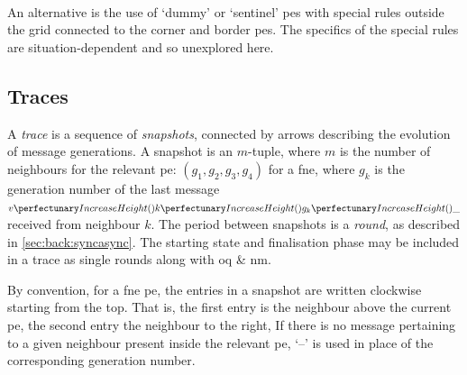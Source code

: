 \begin{cprulesetfloat}
    \begin{cpruleset}
        
        \\
        
        
    \end{cpruleset}
    \caption[Alternative forms of \cref{ruleset:nmp:proxspec}'s Rule 1]{\label{ruleset:nmp:3alts}Alternative forms of \cref{ruleset:nmp:proxspec}'s  for \glspl{pe} on the border of a grid or in the corner of a grid, respectively}
\end{cprulesetfloat}

An alternative is the use of `dummy' or `sentinel' \glspl{pe} with special rules outside the grid connected to the corner and border \glspl{pe}.  The specifics of the special rules are situation-dependent and so unexplored here.

\subsection{Traces}

A \emph{trace} is a sequence of \emph{snapshots}, connected by arrows \tarr{} describing the evolution of message generations. A snapshot is an \(m\)-tuple, where \(m\) is the number of neighbours for the relevant \gls{pe}:  \((g_1, g_2, g_3, g_4)\) for a \gls{fne}, where \(g_k\) is the generation number of the last message \(\cpvv{k}{g_k}{\cpdiscard}\) received from neighbour \(k\).  The period between snapshots is a \emph{round}, as described in \cref{sec:back:syncasync}.  The starting state and finalisation phase may be included in a trace as single rounds along with \gls{oq} \& \gls{nm}.

By convention, for a \gls{fne} \gls{pe}, the entries in a snapshot are written clockwise starting from the top.  That is, the first entry is the neighbour above the current \gls{pe}, the second entry the neighbour to the right, \etc{}  If there is no message pertaining to a given neighbour present inside the relevant \gls{pe}, `--' is used in place of the corresponding generation number.

